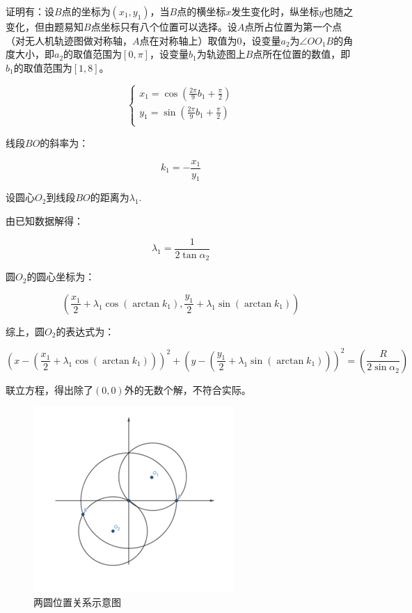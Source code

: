 证明有：设$B$点的坐标为$(x_1,y_1)$，当$B$点的横坐标$x$发生变化时，纵坐标$y$也随之变化，但由题易知$B$点坐标只有八个位置可以选择。设$A$点所占位置为第一个点（对无人机轨迹图做对称轴，$A$点在对称轴上）取值为$0$，设变量$a_2$为$\angle OO_1B$的角度大小，即$a_2$的取值范围为$\left[ 0,\pi \right]$，设变量$b_1$为轨迹图上$B$点所在位置的数值，即$b_1$的取值范围为$\left[ 1,8 \right]$。

\begin{equation}
    \begin{cases}
        x_1 = \cos(\frac{2\pi}{9}b_1 + \frac{\pi}{2}) \\
        y_1 = \sin(\frac{2\pi}{9}b_1 + \frac{\pi}{2}) \\
    \end{cases}
\end{equation}

 线段$BO$的斜率为：

 \begin{equation}
    k_1 = - \frac{x_1}{y_1}
 \end{equation}

 设圆心$O_2$到线段$BO$的距离为$\lambda_1$.

 由已知数据解得：

 \begin{equation}
    \lambda_1 = \frac{1}{2\tan\alpha_2}
 \end{equation}

 圆$O_2$的圆心坐标为：

 \begin{equation}
    \left(
        \frac{x_1}{2} + \lambda_1\cos(\arctan k_1),
        \frac{y_1}{2} + \lambda_1\sin(\arctan k_1)
    \right)
 \end{equation}

综上，圆$O_2$的表达式为：

\begin{equation}
    \left(
        x -
        \left(
            \frac{x_1}{2} + \lambda_1\cos(\arctan k_1)
        \right)
    \right)^2
    +
    \left(
        y -
        \left(
            \frac{y_1}{2} + \lambda_1\sin(\arctan k_1)
        \right)
    \right)^2
    =
    \left(
        \frac{R}{2\sin\alpha_2}
    \right)
\end{equation}

联立方程，得出除了$(0, 0)$外的无数个解，不符合实际。

\begin{figure}
    \centering
    \includegraphics{res/figure111121.png}
    \caption{两圆位置关系示意图}
\end{figure}

